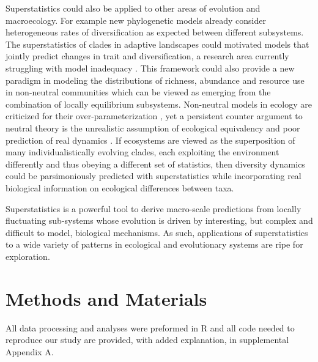 \documentclass[12pt]{article}
\let\citep=\cite
\begin{document}
Superstatistics could also be applied to other areas of evolution and
macroecology.  For example new phylogenetic models already consider
heterogeneous rates of diversification \citep[e.g.,][]{rabosky2014} as
expected between different subsystems. The superstatistics of clades
in adaptive landscapes could motivated models that jointly predict
changes in trait and diversification, a research area currently
struggling with model inadequacy \citep{rabosky2017fisse}. This
framework could also provide a new paradigm in modeling the
distributions of richness, abundance and resource use in non-neutral
communities which can be viewed as emerging from the combination of
locally equilibrium subsystems. Non-neutral models in ecology are
criticized for their over-parameterization \citep{rosindell2011}, yet
a persistent counter argument to neutral theory \citep{hubbell2001} is
the unrealistic assumption of ecological equivalency
\citep{chave2004neutral} and poor prediction of real dynamics
\citep{ricklefs2006neutral}. If ecosystems are viewed as the
superposition of many individualistically evolving clades, each
exploiting the environment differently and thus obeying a different
set of statistics, then diversity dynamics could be parsimoniously
predicted with superstatistics while incorporating real biological
information on ecological differences between taxa.

Superstatistics is a powerful tool to derive macro-scale predictions
from locally fluctuating sub-systems whose evolution is driven by
interesting, but complex and difficult to model, biological
mechanisms. As such, applications of superstatistics to a wide variety
of patterns in ecological and evolutionary systems are ripe for
exploration.


\section{Methods and Materials}

All data processing and analyses were preformed in R \citep{rcite} and
all code needed to reproduce our study are provided, with added
explanation, in supplemental Appendix A.
\end{document}
